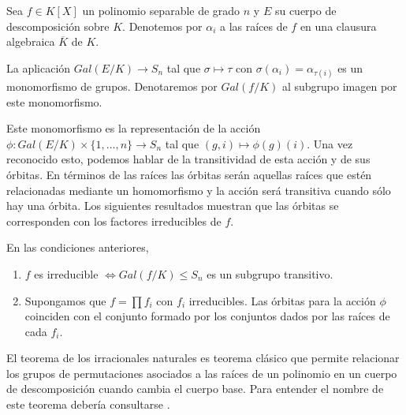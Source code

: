 \begin{proposition}
Sea $f \in K[X]$ un polinomio separable de grado $n$  y $E$ su cuerpo de descomposición sobre $K$. Denotemos por $\alpha_i$ a las raíces de $f$ en una clausura algebraica $\overline{K}$ de $K$. 

La aplicación $Gal(E/K) \to S_n$ tal que $\sigma \mapsto \tau$ con $\sigma(\alpha_i) = \alpha_{\tau(i)}$ es un monomorfismo de grupos. Denotaremos por $Gal(f/K)$ al subgrupo imagen por este monomorfismo. 
\end{proposition}

Este monomorfismo es la representación de la acción $\phi:Gal(E/K) \times \{1,\ldots,n\}\to S_n$ tal que $(g,i) \mapsto \phi(g)(i)$. Una vez reconocido esto, podemos hablar de la transitividad de esta acción y de sus órbitas. En términos de las raíces las órbitas serán aquellas raíces que estén relacionadas mediante un homomorfismo y la acción será transitiva cuando sólo hay una órbita. Los siguientes resultados muestran que las órbitas se corresponden con los factores irreducibles de $f$. 

\begin{proposition}
En las condiciones anteriores, 

\begin{enumerate}
\item $f$ es irreducible $\iff Gal(f/K) \le S_n$ es un subgrupo transitivo.
\item Supongamos que $f = \prod f_i$ con $f_i$ irreducibles. Las órbitas para la acción $\phi$ coinciden con el conjunto formado por los conjuntos dados por las raíces de cada $f_i$. 
\end{enumerate}
\end{proposition}

El teorema de los irracionales naturales es teorema clásico que permite relacionar los grupos de permutaciones asociados a las raíces de un polinomio en un cuerpo de descomposición cuando cambia el cuerpo base. Para entender el nombre de este teorema debería consultarse \cite{cox}.

